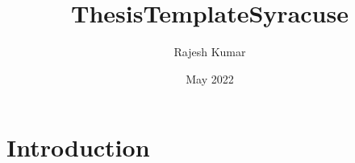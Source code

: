 \documentclass{article}
\title{ThesisTemplateSyracuse}
\author{Rajesh Kumar}
\date{May 2022}
\begin{document}
\maketitle

\section{Introduction}
\end{document}
